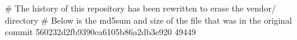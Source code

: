 # The history of this repository has been rewritten to erase the vendor/ directory
# Below is the md5sum and size of the file that was in the original commit
560232d2fb9390ca6105b86a2db3e920
49449

